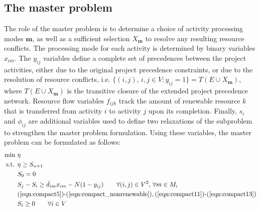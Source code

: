 \documentclass[a4paper,abstracton]{scrartcl}
\begin{document}
\subsection{The master problem}

The role of the master problem is to determine a choice of activity processing modes $\bm{m}$, as well as a sufficient selection $X_{\bm{m}}$ to resolve any resulting resource conflicts. The processing mode for each activity is determined by binary variables $x_{im}$. The $y_{ij}$ variables define a complete set of precedences between the project activities, either due to the original project precedence constraints, or due to the resolution of resource conflicts, i.e. $\{(i,j),\, i,j\in V:y_{ij}=1\}=T(E\cup X_{\bm{m}})$, where $T(E\cup X_{\bm{m}})$ is the transitive closure of the extended project precedence network. Resource flow variables $f_{ijk}$ track the amount of renewable resource $k$ that is transferred from activity $i$ to activity $j$ upon its completion. Finally, $s_i$ and $\phi_{ij}$ are additional variables used to define two relaxations of the subproblem to strengthen the master problem formulation. Using these variables, the master problem can be formulated as follows:  
\begin{align}
\min \ & \eta\label{eqn:master_first}\\
\text{s.t. } & \eta \geq S_{n+1}\\
	     & S_{0}=0\label{eqn:master2}\\
	     & S_{j} - S_{i} \geq \bar{d}_{im}x_{im} - N(1-y_{ij}) \qquad \forall (i,j)\in V^2,\,\forall m\in M_i\label{eqn:master3}\\
	     & \textnormal{(\ref{eqn:compact5})-(\ref{eqn:compact_nonrenewable}),\,(\ref{eqn:compact11})-(\ref{eqn:compact13})}\\
	     & S_i\geq 0 \qquad \forall i\in V\label{eqn:master_last}
\end{align}
\end{document}
